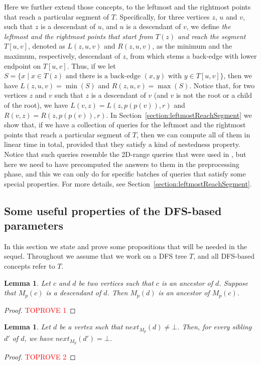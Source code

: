 \documentclass[11pt,a4paper]{article}
\newtheorem{lemma}[theorem]{Lemma}
\begin{document}
Here we further extend those concepts, to the leftmost and the rightmost points that reach a particular segment of $T$. Specifically, for three vertices $z$, $u$ and $v$, such that $z$ is a descendant of $u$, and $u$ is a descendant of $v$, we define \emph{the leftmost and the rightmost points that start from $T(z)$ and reach the segment $T[u,v]$}, denoted as $L(z,u,v)$ and $R(z,u,v)$, as the minimum and the maximum, respectively, descendant of $z$, from which stems a back-edge with lower endpoint on $T[u,v]$. Thus, if we let $S=\{x\mid x\in T(z) \mbox{ and there is a back-edge } (x,y) \mbox{ with } y\in T[u,v]\}$, then we have $L(z,u,v)=\min(S)$ and $R(z,u,v)=\max(S)$. Notice that, for two vertices $z$ and $v$ such that $z$ is a descendant of $v$ (and $v$ is not the root or a child of the root), we have $L(v,z)=L(z,p(p(v)),r)$ and $R(v,z)=R(z,p(p(v)),r)$. In Section~\ref{section:leftmostReachSegment} we show that, if we have a collection of queries for the leftmost and the rightmost points that reach a particular segment of $T$, then we can compute all of them in linear time in total, provided that they satisfy a kind of nestedness property. Notice that such queries resemble the 2D-range queries that were used in \cite{DBLP:conf/esa/Kosinas23}, but here we need to have precomputed the answers to them in the preprocessing phase, and this we can only do for specific batches of queries that satisfy some special properties. For more details, see Section~\ref{section:leftmostReachSegment}.

\subsection{Some useful properties of the DFS-based parameters}
\label{section:usefulProperties}

In this section we state and prove some propositions that will be needed in the sequel. Throughout we assume that we work on a DFS tree $T$, and all DFS-based concepts refer to $T$.

\begin{lemma}
\label{lemma:Mp}
Let $c$ and $d$ be two vertices such that $c$ is an ancestor of $d$. Suppose that $M_p(c)$ is a descendant of $d$. Then $M_p(d)$ is an ancestor of $M_p(c)$.
\end{lemma}
\begin{proof}\textcolor{red}{TOPROVE 1}\end{proof}

\begin{lemma}
\label{lemma:siblingsM}
Let $d$ be a vertex such that $\mathit{next}_{M_p}(d)\neq\bot$. Then, for every sibling $d'$ of $d$, we have $\mathit{next}_{M_p}(d')=\bot$.
\end{lemma}
\begin{proof}\textcolor{red}{TOPROVE 2}\end{proof}
\end{document}
